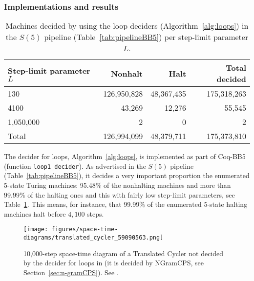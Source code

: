 \subsubsection{Implementations and results}\label{sec:loops:results}

\begin{table}[h!]
  \centering
  \begin{tabular}{|l|rrr|}
    \hline
    Step-limit parameter $L$ & Nonhalt     & Halt       & Total decided \\
    \hline
    130                      & 126,950,828 & 48,367,435 & 175,318,263   \\
    4100                     & 43,269      & 12,276     & 55,545        \\
    1,050,000                & 2           & 0          & 2             \\ \hline
    Total                    & 126,994,099 & 48,379,711 & 175,373,810   \\
    \hline
  \end{tabular}
  \caption{Machines decided by using the loop deciders (Algorithm~\ref{alg:loops}) in the $S(5)$ pipeline (Table~\ref{tab:pipelineBB5}) per step-limit parameter $L$.}\label{tab:paramsLoops}
\end{table}

The decider for loops, Algorithm~\ref{alg:loops}, is implemented as part of Coq-BB5 (function \texttt{loop1\_decider}). As advertised in the $S(5)$ pipeline (Table~\ref{tab:pipelineBB5}), it decides a very important proportion the enumerated 5-state Turing machines: 95.48\% of the nonhalting machines and more than 99.99\% of the halting ones and this with fairly low step-limit parameters, see Table~\ref{tab:paramsLoops}. This means, for instance, that 99.99\% of the enumerated 5-state halting machines halt before $4,100$ steps.

\begin{figure}
  \centering
  \texttt{[image: figures/space-time-diagrams/translated\_cycler\_59090563.png]}

  \caption{10,000-step space-time diagram of a Translated Cycler not decided by the decider for loops in \CoqBB (it is decided by NGramCPS, see Section~\ref{sec:n-gramCPS}). See .}\label{fig:translated-cyclers-more}
\end{figure}



